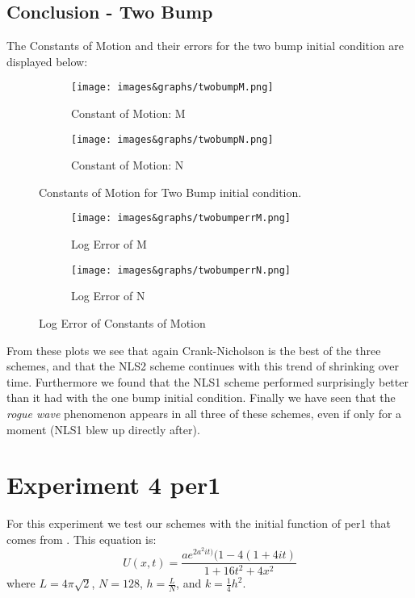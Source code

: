 \documentclass[11pt, oneside]{article}   	%
\begin{document}
\subsection{Conclusion - Two Bump}
The Constants of Motion and their errors for the two bump initial condition are displayed below:
\begin{figure}[H]
    \begin{subfigure}{0.5\textwidth}
        \centering\captionsetup{width=.85\linewidth}%
        \texttt{[image: images\&graphs/twobumpM.png]}
        \caption{Constant of Motion: M}
        \label{EXP3 NLS2 Side}
    \end{subfigure}
    \begin{subfigure}{0.5\textwidth}
        \centering\captionsetup{width=.85\linewidth}%
        \texttt{[image: images\&graphs/twobumpN.png]}
        \caption{Constant of Motion: N}
        \label{EXP3 NLS2 Error}
    \end{subfigure}
\label{fig:image2}
\caption{Constants of Motion for Two Bump initial condition.}
\end{figure}
\begin{figure}[H]
    \begin{subfigure}{0.5\textwidth}
        \centering\captionsetup{width=.85\linewidth}%
        \texttt{[image: images\&graphs/twobumperrM.png]}
        \caption{Log Error of M}
        \label{EXP3 NLS2 Side}
    \end{subfigure}
    \begin{subfigure}{0.5\textwidth}
        \centering\captionsetup{width=.85\linewidth}%
        \texttt{[image: images\&graphs/twobumperrN.png]}
        \caption{Log Error of N}
        \label{EXP3 NLS2 Error}
    \end{subfigure}
\label{fig:image2}
\caption{Log Error of Constants of Motion}
\end{figure}

From these plots we see that again Crank-Nicholson is the best of the three schemes, and that the NLS2 scheme continues with this trend of shrinking over time. Furthermore we found that the NLS1 scheme performed surprisingly better than it had with the one bump initial condition. Finally we have seen that the \textit{rogue wave} phenomenon appears in all three of these schemes, even if only for a moment (NLS1 blew up directly after). 

\section{Experiment 4 per1}
For this experiment we test our schemes with the initial function of per1 that comes from . This equation is:
\begin{equation*}
    U(x,t) = \dfrac{ae^{2a^2it)}(1 - 4( 1 + 4it)}{ 1 + 16t^2 + 4x^2}
\end{equation*}
where $L = 4\pi\sqrt{2}$, $N = 128$, $h = \frac{L}{N}$, and $k = \frac{1}{4}h^2$. 
\end{document}
